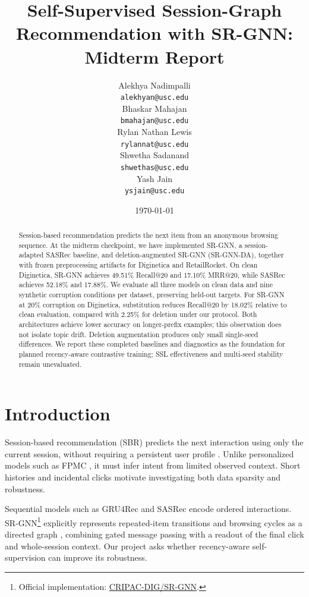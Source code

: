 \documentclass[11pt]{article}
\title{Self-Supervised Session-Graph Recommendation with SR-GNN: \\ Midterm Report}
\author{Alekhya Nadimpalli\\
  \texttt{alekhyan@usc.edu} \\\And
  Bhaskar Mahajan \\
  \texttt{bmahajan@usc.edu} \\\And
  Rylan Nathan Lewis \\
  \texttt{rylannat@usc.edu} \\\AND
  Shwetha Sadanand \\
  \texttt{shwethas@usc.edu} \\\And
  Yash Jain \\
  \texttt{ysjain@usc.edu} \\
  }
\date{\today}
\begin{document}
\setlength{\bibsep}{0.0pt}
\maketitle

\begin{abstract}
Session-based recommendation predicts the next item from an anonymous browsing sequence. At the midterm checkpoint, we have implemented SR-GNN, a session-adapted SASRec baseline, and deletion-augmented SR-GNN (SR-GNN-DA), together with frozen preprocessing artifacts for Diginetica and RetailRocket. On clean Diginetica, SR-GNN achieves 49.51\% Recall@20 and 17.10\% MRR@20, while SASRec achieves 52.18\% and 17.88\%. We evaluate all three models on clean data and nine synthetic corruption conditions per dataset, preserving held-out targets. For SR-GNN at 20\% corruption on Diginetica, substitution reduces Recall@20 by 18.02\% relative to clean evaluation, compared with 2.25\% for deletion under our protocol. Both architectures achieve lower accuracy on longer-prefix examples; this observation does not isolate topic drift. Deletion augmentation produces only small single-seed differences. We report these completed baselines and diagnostics as the foundation for planned recency-aware contrastive training; SSL effectiveness and multi-seed stability remain unevaluated.
\end{abstract}

\section{Introduction}
Session-based recommendation (SBR) predicts the next interaction using only the current session, without requiring a persistent user profile \citep{hidasi2015session}. Unlike personalized models such as FPMC \citep{rendle2010factorizing}, it must infer intent from limited observed context. Short histories and incidental clicks motivate investigating both data sparsity and robustness.

Sequential models such as GRU4Rec \citep{hidasi2015session} and SASRec \citep{kang2018self} encode ordered interactions. SR-GNN\footnote{Official implementation: \href{https://github.com/CRIPAC-DIG/SR-GNN}{CRIPAC-DIG/SR-GNN}.} explicitly represents repeated-item transitions and browsing cycles as a directed graph \citep{wu2019session}, combining gated message passing \citep{li2015gated} with a readout of the final click and whole-session context. Our project asks whether recency-aware self-supervision can improve its robustness.
\end{document}

